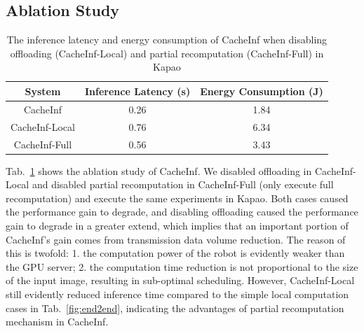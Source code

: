 \subsection{Ablation Study}
\begin{table}[htb]
    \begin{tabular}{c|c|c}
        \toprule
        System & Inference Latency (s) & Energy Consumption (J)\\
        \midrule
        CacheInf & 0.26 & 1.84 \\ 
        CacheInf-Local & 0.76 & 6.34 \\ 
        CacheInf-Full & 0.56  & 3.43 \\ 
        \bottomrule

    \end{tabular}
    \caption[sample rates]{The inference latency and energy consumption of CacheInf when disabling offloading (CacheInf-Local) and partial recomputation (CacheInf-Full) in Kapao}
    \label{abl}
\end{table}
Tab.~\ref{abl} shows the ablation study of CacheInf.
We disabled offloading in CacheInf-Local and disabled partial recomputation in CacheInf-Full (only execute full recomputation) and execute the same experiments in Kapao.
Both cases caused the performance gain to degrade, and disabling offloading caused the performance gain to degrade in a greater extend, which implies that an important portion of CacheInf's gain comes from transmission data volume reduction.
The reason of this is twofold: 1. the computation power of the robot is evidently weaker than the GPU server; 2. the computation time reduction is not proportional to the size of the input image, resulting in sub-optimal scheduling.
However, CacheInf-Local still evidently reduced inference time compared to the simple local computation cases in Tab.~\ref{fig:end2end}, indicating the advantages of partial recomputation mechanism in CacheInf.

    
